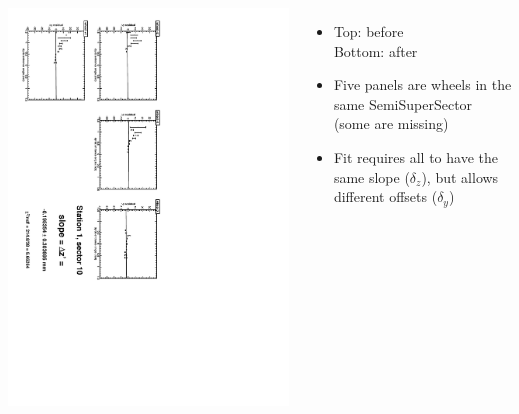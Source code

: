 \documentclass[compress]{beamer}
\begin{document}
\begin{frame}
\begin{columns}
\vfill
\includegraphics[height=\linewidth, angle=90]{zfits_after/zfit_1_10.pdf}
\begin{itemize}
\item Top: before \\ Bottom: after
\item Five panels are wheels in the same SemiSuperSector (some are missing)
\item Fit requires all to have the same slope ($\delta_z$), but allows different offsets ($\delta_y$)
\end{itemize}
\end{columns}
\end{frame}
\end{document}
